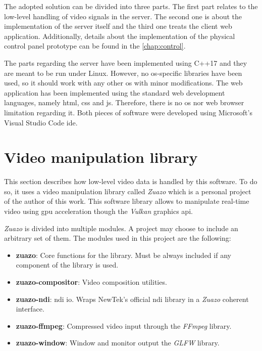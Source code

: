 \documentclass[../main.tex]{subfiles}
\begin{document}
\label{chap:desc}

The adopted solution can be divided into three parts. The first part relates to the low-level handling of video signals in the server. The second one is about the implementation of the server itself and the third one treats the client web application. Additionally, details about the implementation of the physical control panel prototype can be found in the \autoref{chap:control}.\newline

The parts regarding the server have been implemented using C++17 and they are meant to be run under Linux. However, no \gls{os}-specific libraries have been used, so it should work with any other \gls{os} with minor modifications. The web application has been implemented using the standard web development languages, namely \gls{html}, \gls{css} and \gls{js}. Therefore, there is no \gls{os} nor web browser limitation regarding it. Both pieces of software were developed using Microsoft's Visual Studio Code \gls{ide}.\newline

\section{Video manipulation library}

This section describes how low-level video data is handled by this software. To do so, it uses a video manipulation library called \textit{Zuazo} which is a  personal project of the author of this work. This software library allows to manipulate real-time video using \gls{gpu} acceleration though the \textit{Vulkan} graphics \gls{api}.\newline

\textit{Zuazo} is divided into multiple modules. A project may choose to include an arbitrary set of them. The modules used in this project are the following:

\begin{itemize}
    \item \textbf{zuazo}: Core functions for the library. Must be always included if any component of the library is used.
    \item \textbf{zuazo-compositor}: Video composition utilities.
    \item \textbf{zuazo-ndi}: \Gls{ndi} \gls{io}. Wraps NewTek's official \gls{ndi} library in a \textit{Zuazo} coherent interface.
    \item \textbf{zuazo-ffmpeg}: Compressed video input through the \textit{FFmpeg} library.
    \item \textbf{zuazo-window}: Window and monitor output the \textit{GLFW} library.
\end{itemize}
\end{document}
